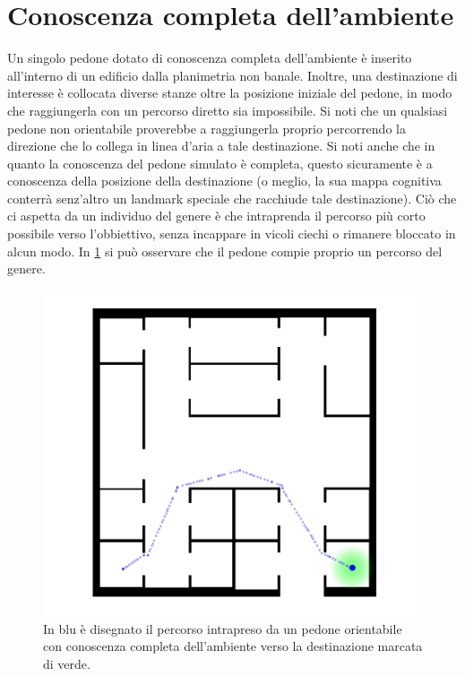 \documentclass[12pt,a4paper,openright,oneside]{book}
\begin{document}
\section{Conoscenza completa dell'ambiente}
\label{complete-knowledge-case-study}
Un singolo pedone dotato di conoscenza completa dell'ambiente è inserito all'interno di un edificio dalla planimetria non banale. Inoltre, una destinazione di interesse è collocata diverse stanze oltre la posizione iniziale del pedone, in modo che raggiungerla con un percorso diretto sia impossibile. Si noti che un qualsiasi pedone non orientabile proverebbe a raggiungerla proprio percorrendo la direzione che lo collega in linea d'aria a tale destinazione. Si noti anche che in quanto la conoscenza del pedone simulato è completa, questo sicuramente è a conoscenza della posizione della destinazione (o meglio, la sua mappa cognitiva conterrà senz'altro un landmark speciale che racchiude tale destinazione). Ciò che ci aspetta da un individuo del genere è che intraprenda il percorso più corto possibile verso l'obbiettivo, senza incappare in vicoli ciechi o rimanere bloccato in alcun modo. In \cref{fig:complete-knowledge} si può osservare che il pedone compie proprio un percorso del genere.
\begin{figure}
	\centering
	\includegraphics[width=0.7\linewidth]{figures/complete-knowledge.png}
	\caption{In blu è disegnato il percorso intrapreso da un pedone orientabile con conoscenza completa dell'ambiente verso la destinazione marcata di verde.}
	\label{fig:complete-knowledge}
\end{figure}
\end{document}

